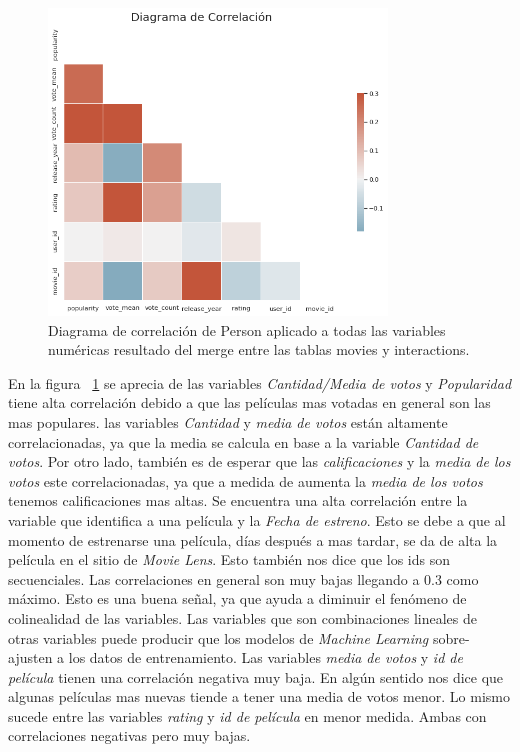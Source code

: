 \documentclass[11pt,a4paper,twoside]{thesis}
\begin{document}
\begin{figure}[h!]
	\centering
	\includegraphics[width=9cm]{./images/Correlations.png}
	\caption{Diagrama de correlación de Person aplicado a todas las variables numéricas resultado del merge entre las tablas movies y interactions.}
	\label{fig:correlationPlot}
\end{figure}	


En la figura ~\ref{fig:correlationPlot} se aprecia de las variables \textit{Cantidad/Media de votos} y \textit{Popularidad} tiene alta correlación debido a que las películas mas votadas en general son las mas populares. 
las variables \textit{Cantidad} y \textit{media de votos} están altamente correlacionadas, ya que la media se calcula en base a la variable \textit{Cantidad de votos}. Por otro lado, también es de esperar que las \textit{calificaciones} y la \textit{media de los votos} este correlacionadas, ya que a medida de aumenta la \textit{media de los votos} tenemos calificaciones mas altas. Se encuentra una alta correlación entre la variable que identifica a una película y la \textit{Fecha de estreno}. Esto se debe a que al momento de estrenarse una película, días después a mas tardar, se da de alta la película en el sitio de \textit{Movie Lens}. Esto también nos dice que los ids son secuenciales.
Las correlaciones en general son muy bajas llegando a 0.3 como máximo. Esto es una buena señal, ya que ayuda a diminuir el fenómeno de colinealidad de las variables. Las variables que son combinaciones lineales de otras variables puede producir que los modelos de \textit{Machine Learning} sobre-ajusten a los datos de entrenamiento. 
Las variables \textit{media de votos} y \textit{id de película} tienen una correlación negativa muy baja. En algún sentido nos dice que algunas películas mas nuevas tiende a tener una media de votos menor. Lo mismo sucede entre las variables \textit{rating} y \textit{id de película} en menor medida. Ambas con correlaciones negativas pero muy bajas.
\end{document}
